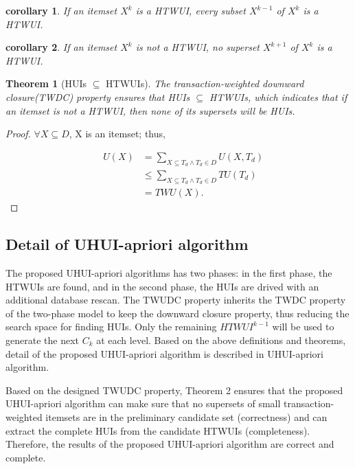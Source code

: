 \documentclass[conference]{IEEEtran}
\newtheorem{IEEEthe}{Theorem}
\newtheorem{IEEEcor}{corollary}
\begin{document}
\begin{IEEEcor}
\label{cor:sub}
If an itemset $X^k$ is a HTWUI, every subset $X^{k-1}$ of $X^k$ is a HTWUI.
\end{IEEEcor}

\begin{IEEEcor}
\label{cor:super}
If an itemset $X^k$ is not a HTWUI, no superset $X^{k+1}$ of $X^k$ is a HTWUI.
\end{IEEEcor}

\begin{IEEEthe}[HUIs $\subseteq$ HTWUIs]
\label{the:IN}
The transaction-weighted downward closure(TWDC) property ensures that HUIs $\subseteq$ HTWUIs, which indicates that if an itemset is not a HTWUI, then none of its supersets will be HUIs.
\end{IEEEthe}

\begin{proof}
\label{pro:IN}
$\forall X \subseteq D$, X is an itemset; thus,

\vspace{-0.7cm}
{\setlength\arraycolsep{1pt}
\small
\begin{eqnarray}
\label{eq:IN}
\ & U(X) & = \sum_{X\subseteq T_d\wedge T_d\in D}U(X, T_d) {}
\nonumber \\
&&{} \leq \sum_{X\subseteq T_d\wedge T_d\in D}TU(T_d) {}
\nonumber \\
&&{} = TWU(X).
\end{eqnarray}}
\vspace{-1.2cm}

\end{proof}

\vspace{-0.1cm}
\subsection{Detail of UHUI-apriori algorithm}

The proposed UHUI-apriori algorithms has two phases: in the first phase, the HTWUIs are found, and in the second phase, the HUIs are drived with an additional database rescan. The TWUDC property inherits the TWDC property of the two-phase model to keep the downward closure property, thus reducing the search space for finding HUIs. Only the remaining $HTWUI^{k-1}$ will be used to generate the next $C_k$ at each level. Based on the above definitions and theorems, detail of the proposed UHUI-apriori algorithm is described in UHUI-apriori algorithm.

Based on the designed TWUDC property, Theorem 2 ensures that the proposed UHUI-apriori algorithm can make sure that no supersets of small transaction-weighted itemsets are in the preliminary candidate set (correctness) and can extract the complete HUIs from the candidate HTWUIs (completeness). Therefore, the results of the proposed UHUI-apriori algorithm are correct and complete.
\end{document}

